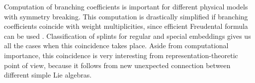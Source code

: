 \documentclass{article}
\begin{document}
Computation of branching coefficients is important for different physical models with symmetry
breaking. This computation is drastically simplified if branching coefficients coincide with weight
multiplicities, since efficient Freudental formula can be used \cite{moody1982fast}. Classification
of splints for regular and special embeddings gives us all the cases when this coincidence takes
place. Aside from computational importance, this coincidence is very interesting from
representation-theoretic point of view, because it follows from new unexpected connection between
different simple Lie algebras. 

{} 

\end{document}
